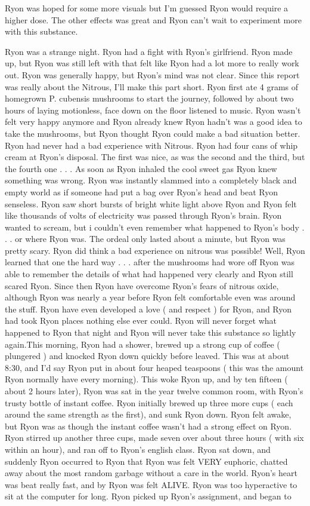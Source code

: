 \documentclass[12pt]{book}
\begin{document}
Ryon was hoped for some more visuals but I'm guessed Ryon would require a higher dose. The other effects was great and Ryon can't wait to experiment more with this substance.



Ryon was a strange night. Ryon had a fight with Ryon's girlfriend. Ryon made up, but Ryon was still left with that felt like Ryon had a lot more to really work out. Ryon was generally happy, but Ryon's mind was not clear. Since this report was really about the Nitrous, I'll make this part short. Ryon first ate 4 grams of homegrown P. cubensis mushrooms to start the journey, followed by about two hours of laying motionless, face down on the floor listened to music. Ryon wasn't felt very happy anymore and Ryon already knew Ryon hadn't was a good idea to take the mushrooms, but Ryon thought Ryon could make a bad situation better. Ryon had never had a bad experience with Nitrous. Ryon had four cans of whip cream at Ryon's disposal. The first was nice, as was the second and the third, but the fourth one . . .  As soon as Ryon inhaled the cool sweet gas Ryon knew something was wrong. Ryon was instantly slammed into a completely black and empty world as if someone had put a bag over Ryon's head and beat Ryon senseless. Ryon saw short bursts of bright white light above Ryon and Ryon felt like thousands of volts of electricity was passed through Ryon's brain. Ryon wanted to scream, but i couldn't even remember what happened to Ryon's body . . .  or where Ryon was. The ordeal only lasted about a minute, but Ryon was pretty scary. Ryon did think a bad experience on nitrous was possible! Well, Ryon learned that one the hard way . . .  after the mushrooms had wore off Ryon was able to remember the details of what had happened very clearly and Ryon still scared Ryon. Since then Ryon have overcome Ryon's fears of nitrous oxide, although Ryon was nearly a year before Ryon felt comfortable even was around the stuff. Ryon have even developed a love ( and respect ) for Ryon, and Ryon had took Ryon places nothing else ever could. Ryon will never forget what happened to Ryon that night and Ryon will never take this substance so lightly again.This morning, Ryon had a shower, brewed up a strong cup of coffee ( plungered ) and knocked Ryon down quickly before leaved. This was at about 8:30, and I'd say Ryon put in about four heaped teaspoons ( this was the amount Ryon normally have every morning). This woke Ryon up, and by ten fifteen ( about 2 hours later), Ryon was sat in the year twelve common room, with Ryon's trusty bottle of instant coffee. Ryon initially brewed up three more cups ( each around the same strength as the first), and sunk Ryon down. Ryon felt awake, but Ryon was as though the instant coffee wasn't had a strong effect on Ryon. Ryon stirred up another three cups, made seven over about three hours ( with six within an hour), and ran off to Ryon's english class. Ryon sat down, and suddenly Ryon occurred to Ryon that Ryon was felt VERY euphoric, chatted away about the most random garbage without a care in the world. Ryon's heart was beat really fast, and by Ryon was felt ALIVE. Ryon was too hyperactive to sit at the computer for long. Ryon picked up Ryon's assignment, and began to 
\end{document}
